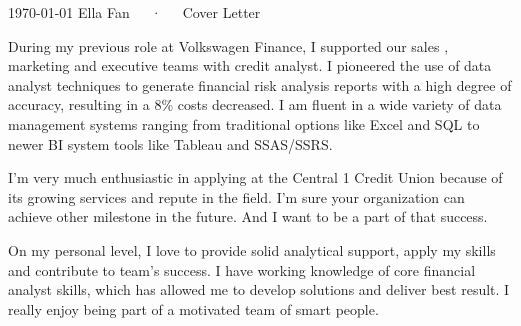 \documentclass[11pt, a4paper]{awesome-cv}
\begin{document}
\makecvheader[R]

\makecvfooter
  {\today}
  {Ella Fan~~~·~~~Cover Letter}
  {}

\makelettertitle

\begin{cvletter}

During my previous role at Volkswagen Finance, I supported our sales , marketing and executive teams with credit analyst. 
I pioneered the use of data analyst techniques to generate financial risk analysis reports with a high degree of accuracy, 
resulting in a 8\% costs decreased. I am fluent in a wide variety of data management systems ranging from traditional options 
like Excel and SQL to newer BI system tools like Tableau and SSAS/SSRS.

I'm very much enthusiastic in applying at the Central 1 Credit Union because of its growing services and repute in the field. 
I'm sure your organization can achieve other milestone in the future. And I want to be a part of that success.

On my personal level, I love to provide solid analytical support, apply my skills and contribute to team's success. 
I have working knowledge of core financial analyst skills, which has allowed me to develop solutions and deliver best result. 
I really enjoy being part of a motivated team of smart people.

\end{cvletter}


\makeletterclosing
\end{document}
